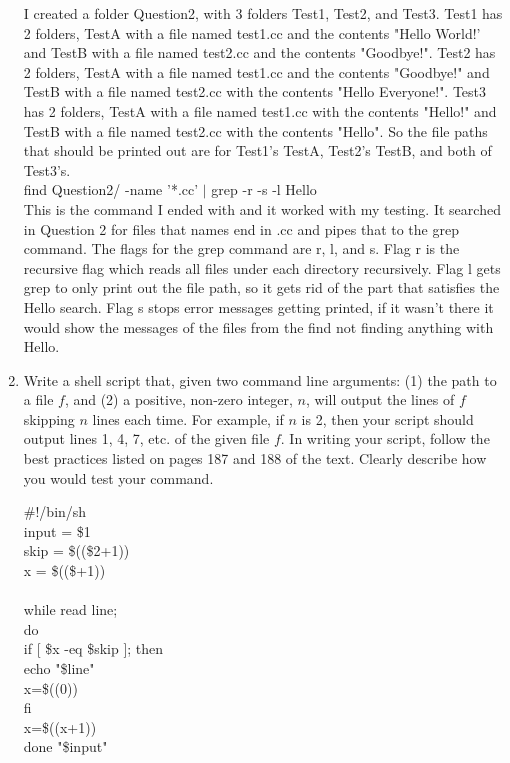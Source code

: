 \documentclass{article}
\begin{document}
\begin{enumerate}
  I created a folder Question2, with 3 folders Test1, Test2, and Test3. Test1 has 2 folders, TestA with a file named test1.cc and the contents "Hello World!' and TestB with a file named test2.cc and the contents "Goodbye!". Test2 has 2 folders, TestA with a file named test1.cc and the contents "Goodbye!" and TestB with a file named test2.cc with the contents "Hello Everyone!". Test3 has 2 folders, TestA with a file named test1.cc with the contents "Hello!" and TestB with a file named test2.cc with the contents "Hello". So  the file paths that should be printed out are for Test1's TestA, Test2's TestB, and both of Test3's.\\
  
  find Question2/ -name '*.cc' $|$ grep -r -s -l Hello\\
  This is the command I ended with and it worked with my testing. It searched in Question 2 for files that names end in .cc and pipes that to the grep command. The flags for the grep command are r, l, and s. Flag r is the recursive flag which reads all files under each directory recursively. Flag l gets grep to only print out the file path, so it gets rid of the part that satisfies the Hello search. Flag s stops error messages getting printed, if it wasn't there it would show the messages of the files from the find not finding anything with Hello.

\item Write a shell script that, given two command line arguments: (1)
  the path to a file $f$, and (2) a positive, non-zero integer, $n$, will
  output the lines of $f$ skipping $n$ lines each time. For example,
  if $n$ is 2, then your script should output lines 1, 4, 7, etc. of
  the given file $f$.
  In writing your script, follow
  the best practices listed on pages 187 and 188 of the text. Clearly describe
  how you would test your command.
    
    $\#$!/bin/sh\\
    input = \$1\\
    skip = \$((\$2+1))\\
    x = \$((\$+1))\\
    \\
    while read line;\\
    do\\
       if [ \$x -eq \$skip ]; then\\
            echo "\$line"\\
            x=\$((0))\\
        fi\\
        x=\$((x+1))\\
    done \< "\$input"\\


\end{enumerate}
\end{document}

